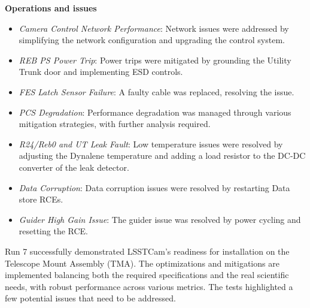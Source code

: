 \textbf{Operations and issues} \\
\begin{itemize}
    \item \textit{Camera Control Network Performance}: Network issues were addressed by simplifying the network configuration and upgrading the control system.
    \item \textit{REB PS Power Trip}: Power trips were mitigated by grounding the Utility Trunk door and implementing ESD controls.
    \item \textit{FES Latch Sensor Failure}: A faulty cable was replaced, resolving the issue.
    \item \textit{PCS Degradation}: Performance degradation was managed through various mitigation strategies, with further analysis required.
    \item \textit{R24/Reb0 and UT Leak Fault}: Low temperature issues were resolved by adjusting the Dynalene temperature and adding a load resistor to the DC-DC converter of the leak detector.
    \item \textit{Data Corruption}: Data corruption issues were resolved by restarting Data store RCEs.
    \item \textit{Guider High Gain Issue}: The guider issue was resolved by power cycling and resetting the RCE.
\end{itemize}

Run 7 successfully demonstrated LSSTCam's readiness for installation on the Telescope Mount Assembly (TMA). The optimizations and mitigations are implemented balancing both the required specifications and the real scientific needs, with robust performance across various metrics. The tests highlighted a few potential issues that need to be addressed. 

\clearpage